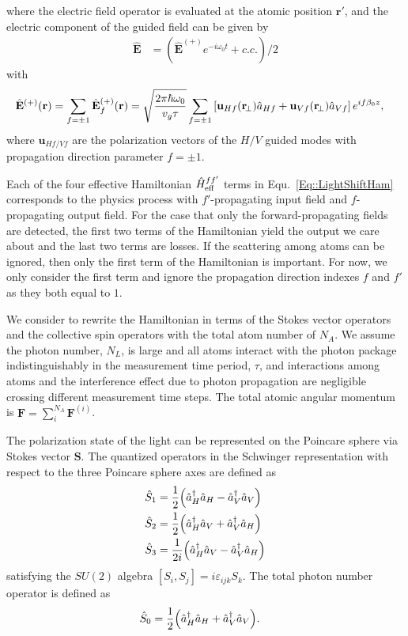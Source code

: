 \documentclass[preprint,aps,pra,onecolumn]{revtex4-1} %
\begin{document}
where the electric field operator is evaluated at the atomic position $\mathbf{r}'$, and the electric component of the guided field can be given by
\begin{align}
\hat{\mathbf{E}} &= (\hat{\mathbf{E}}^{(+)}e^{-i\omega_0 t}+c.c.)/2
\end{align}   
with
\begin{align}
\hat{\mathbf{E}}^{(+)}(\mathbf{r}) &= \sum_{f=\pm 1} \hat{\mathbf{E}}^{(+)}_f(\mathbf{r}) = \sqrt{\frac{2\pi \hbar \omega_0}{v_g\tau}}\sum_{f=\pm 1} \left[ \mathbf{u}_{Hf}(\mathbf{r}\!_\perp)\hat{a}_{Hf} + \mathbf{u}_{Vf}(\mathbf{r}\!_\perp)\hat{a}_{Vf} \right]e^{if\beta_0 z},
\end{align}
where $\mathbf{u}_{Hf/Vf}$ are the polarization vectors of the $H/V$ guided modes with propagation direction parameter $f=\pm 1$. 

Each of the four effective Hamiltonian $\hat{H}_{\rm eff}^{ff'}$ terms in Equ.~\eqref{Eq::LightShiftHam} corresponds to the physics process with $f'$-propagating input field and $f$-propagating output field. For the case that only the forward-propagating fields are detected, the first two terms of the Hamiltonian yield the output we care about and the last two terms are losses. If the scattering among atoms can be ignored, then only the first term of the Hamiltonian is important. For now, we only consider the first term and ignore the propagation direction indexes $f$ and $f'$ as they both equal to $1$. 

We consider to rewrite the Hamiltonian in terms of the Stokes vector operators and the collective spin operators with the total atom number of $ N_A $. We assume the photon number, $ N_L $, is large and all atoms interact with the photon package indistinguishably in the measurement time period, $\tau$, and interactions among atoms and the interference effect due to photon propagation are negligible crossing different measurement time steps. The total atomic angular momentum is $\mathbf{F}=\sum^{N_A}_i\mathbf{F}^{(i)}$. 

The polarization state of the light can be represented on the Poincare sphere via Stokes vector $ \mathbf{S} $. The quantized operators in the Schwinger representation with respect to the three Poincare sphere axes are defined as  
\begin{align}
\hat{S}_1&= \frac{1}{2} \Big( \hat{a}_H^\dagger \hat{a}_H -  \hat{a}_V^\dagger \hat{a}_V \Big) \\
\hat{S}_2&= \frac{1}{2} \Big( \hat{a}_H^\dagger \hat{a}_V +  \hat{a}_V^\dagger \hat{a}_H \Big)\\
\hat{S}_3&= \frac{1}{2i} \Big( \hat{a}_H^\dagger \hat{a}_V -  \hat{a}_V^\dagger \hat{a}_H \Big)
\end{align}
satisfying the $ SU(2) $ algebra $ [S_i,S_j]=i\varepsilon_{ijk}S_k $. The total photon number operator is defined as
\begin{align}
\hat{S}_0&= \frac{1}{2} \Big( \hat{a}_H^\dagger \hat{a}_H +  \hat{a}_V^\dagger \hat{a}_V \Big).
\end{align}
\end{document}
